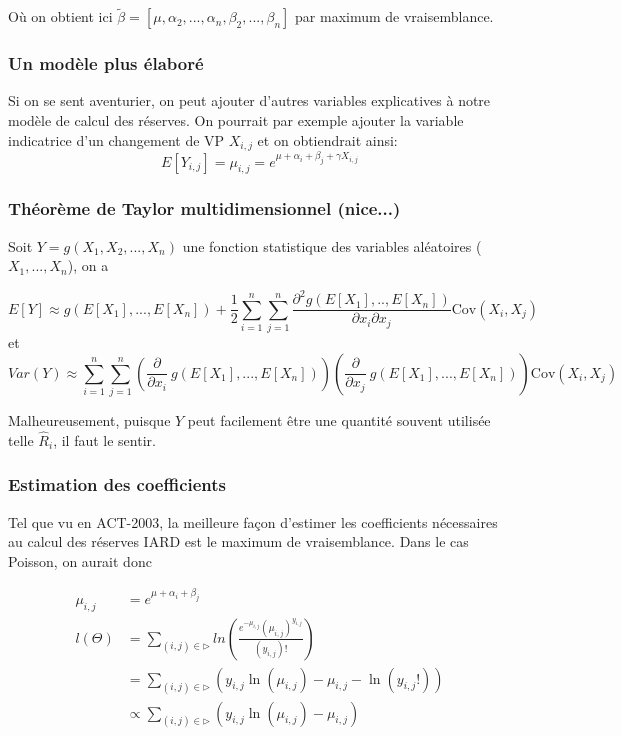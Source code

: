 Où on obtient ici $\tilde{\beta}=[\mu, \alpha_2,...,\alpha_n,\beta_2,...,\beta_n]$ par maximum de vraisemblance.

\subsubsection*{Un modèle plus élaboré}

Si on se sent aventurier, on peut ajouter d'autres variables explicatives à notre modèle de calcul des réserves. On pourrait par exemple ajouter la variable indicatrice d'un changement de VP $X_{i,j}$ et on obtiendrait ainsi:
$$E[Y_{i,j}]=\mu_{i,j} = e^{\mu + \alpha_i + \beta_j + \gamma X_{i,j}}$$

\subsubsection*{Théorème de Taylor multidimensionnel (nice...)}

Soit $Y=g(X_1,X_2,...,X_n)$ une fonction statistique des variables aléatoires ($X_1,...,X_n$), on a 

$$\boxed{E[Y] \approx g(E[X_1],...,E[X_n])+\frac{1}{2}\sum_{i=1}^n \sum_{j=1}^n \frac{\partial^2 g(E[X_1],..,E[X_n])}{\partial x_i \partial x_j}\text{Cov}(X_i,X_j)}$$
et
$$\boxed{Var(Y) \approx \sum_{i=1}^n \sum_{j=1}^n \left(\frac{\partial}{\partial x_i}\ g(E[X_1],...,E[X_n]) \right) \left(\frac{\partial}{\partial x_j}\ g(E[X_1],...,E[X_n]) \right) \text{Cov}(X_i, X_j)}$$

Malheureusement, puisque $Y$ peut facilement être une quantité souvent utilisée telle $\widehat{R}_i$, il faut le sentir.

\subsubsection*{Estimation des coefficients}

Tel que vu en ACT-2003, la meilleure façon d'estimer les coefficients nécessaires au calcul des réserves IARD est le maximum de vraisemblance. Dans le cas Poisson, on aurait donc

$$\begin{aligned}
\mu_{i,j} &= e^{\mu + \alpha_i + \beta_j} \\
l(\Theta) &= \sum_{(i,j) \in \rhd} ln\left(\frac{e^{-\mu_{i,j}}(\mu_{i,j})^{y_{i,j}}}{(y_{i,j})!} \right) \\
 &= \sum_{(i,j) \in \rhd} \left(y_{i,j} \ln(\mu_{i,j}) - \mu_{i,j} - \ln(y_{i,j}!) \right) \\
 &\propto \sum_{(i,j) \in \rhd} \left(y_{i,j}\ln(\mu_{i,j}) - \mu_{i,j} \right)
\end{aligned}$$

